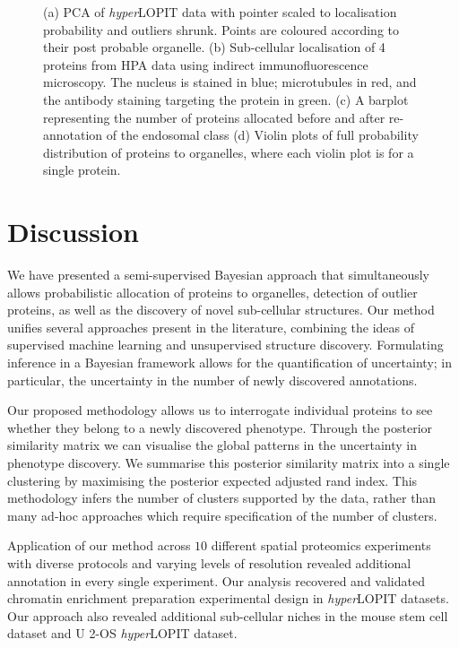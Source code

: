 \documentclass[12pt,english]{article}
\begin{document}
\begin{figure}[h]
\begin{subfigure}[t]{1\textwidth}
		\caption{}
	\end{subfigure}
	\caption{(a) PCA of \textit{hyper}LOPIT data with pointer scaled to localisation probability and outliers shrunk. Points are coloured according to their post probable organelle. (b) Sub-cellular localisation of 4 proteins from HPA data using indirect immunofluorescence microscopy. The nucleus is stained in blue; microtubules in red, and the antibody staining targeting the protein in green. (c) A barplot representing the number of proteins allocated before and after re-annotation of the endosomal class (d) Violin plots of full probability distribution of proteins to organelles, where each violin plot is for a single protein.
	}
	\label{figure:u2os}
\end{figure}
\clearpage 
\section{Discussion}
We have presented a semi-supervised Bayesian approach that simultaneously allows probabilistic allocation of proteins to organelles, detection of outlier proteins, as well as the discovery of novel sub-cellular structures. Our method unifies several approaches present in the literature, combining the ideas of supervised machine learning and unsupervised structure discovery. Formulating inference in a Bayesian framework allows for the quantification of uncertainty; in particular, the uncertainty in the number of newly discovered annotations.

Our proposed methodology allows us to interrogate individual proteins to see whether they belong to a newly discovered phenotype. Through the posterior similarity matrix we can visualise the global patterns in the uncertainty in phenotype discovery. We summarise this posterior similarity matrix into a single clustering by maximising the posterior expected adjusted rand index. This methodology infers the number of clusters supported by the data, rather than many ad-hoc approaches which require specification of the number of clusters.

Application of our method across $10$ different spatial proteomics experiments with diverse protocols and varying levels of resolution revealed additional annotation in every single experiment. Our analysis recovered and validated chromatin enrichment preparation experimental design in \textit{hyper}LOPIT datasets. Our approach also revealed additional sub-cellular niches in the mouse stem cell dataset and U 2-OS \textit{hyper}LOPIT dataset.
\end{document}
